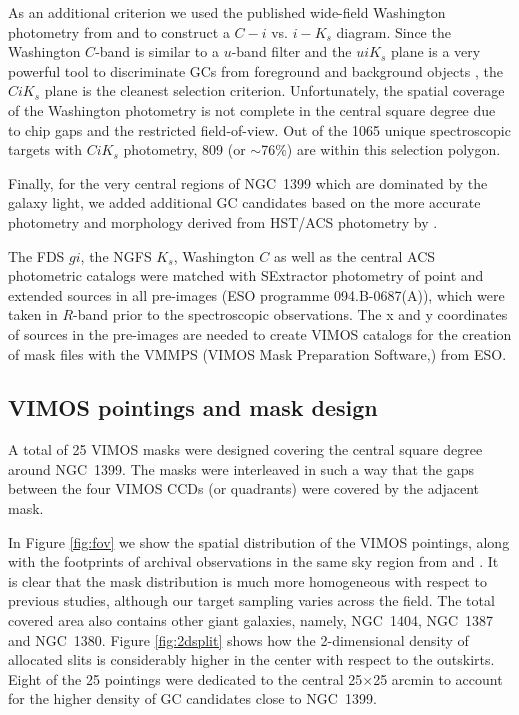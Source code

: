 \documentclass[useAMS,usenatbib]{mn2e}
\begin{document}
As an additional criterion we used the published wide-field Washington photometry from \citet{Dirsch04} and \citet{Bassino} to construct a $C-i$ vs. $i-K_s$ diagram. Since the Washington $C$-band is similar to a $u$-band filter and the $uiK_s$ plane is a very powerful tool to discriminate GCs from foreground and background objects \citep{Munoz14}, the $CiK_s$ plane is the cleanest selection criterion. Unfortunately, the spatial coverage of the Washington photometry is not complete in the central square degree due to chip gaps and the restricted field-of-view. 
Out of the 1065 unique spectroscopic targets with $CiK_s$ photometry, 809 (or $\sim$76\%) are within this selection polygon.

Finally, for the very central regions of NGC~1399 which are dominated by the galaxy light, we added additional GC candidates based on the more accurate photometry and morphology derived from HST/ACS photometry by \citet{Puzia14}.

The FDS $gi$, the NGFS $K_s$, Washington $C$ as well as the central ACS  photometric catalogs were matched with SExtractor photometry of point and extended sources in all pre-images (ESO programme 094.B-0687(A)), which were taken in $R$-band prior to the spectroscopic observations. The x and y coordinates of sources in the pre-images are needed to create VIMOS catalogs for the creation of mask files with the VMMPS (VIMOS Mask Preparation Software,\citealt{Bottini05}) from ESO.

\subsection{VIMOS pointings and mask design}
\label{sec:VIMOSpointings}

A total of 25 VIMOS masks were designed covering the central square degree around NGC~1399. The masks were interleaved in such a way that the gaps between the four VIMOS CCDs (or quadrants) were covered by the adjacent mask. 

In Figure \ref{fig:fov} we show the spatial distribution of the VIMOS pointings, along with the footprints of archival observations in the same sky region from \citet{Schuberth} and \citet{Bergond07}. It is clear that the mask distribution is much more homogeneous with respect to previous studies, although our target sampling varies across the field. The total covered area also contains other giant galaxies, namely, NGC~1404, NGC~1387 and NGC~1380.  
Figure \ref{fig:2dsplit} shows how the 2-dimensional density of allocated slits is considerably higher in the center with respect to the outskirts. Eight of the 25 pointings were dedicated to the central 25$\times$25 arcmin to account for the higher density of GC candidates close to NGC~1399. 
\end{document}
